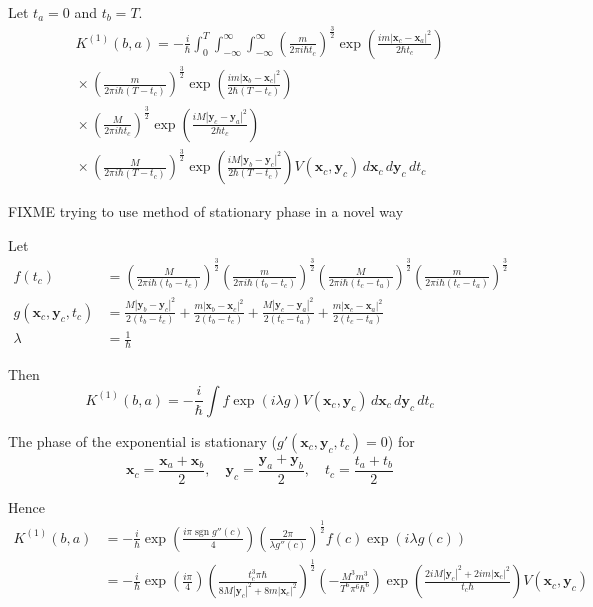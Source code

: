Let $t_a=0$ and $t_b=T$.
\begin{multline*}
K^{(1)}(b,a)=-\frac{i}{\hbar}\int_0^T\int_{-\infty}^\infty\int_{-\infty}^\infty
\left(\frac{m}{2\pi i\hbar t_c}\right)^\frac{3}{2}
\exp\left(\frac{im|\mathbf x_c-\mathbf x_a|^2}{2\hbar t_c}\right)
\\
{}\times
\left(\frac{m}{2\pi i\hbar(T-t_c)}\right)^\frac{3}{2}
\exp\left(\frac{im|\mathbf x_b-\mathbf x_c|^2}{2\hbar(T-t_c)}\right)
\\
{}\times
\left(\frac{M}{2\pi i\hbar t_c}\right)^\frac{3}{2}
\exp\left(\frac{iM|\mathbf y_c-\mathbf y_a|^2}{2\hbar t_c}\right)
\\
{}\times
\left(\frac{M}{2\pi i\hbar(T-t_c)}\right)^\frac{3}{2}
\exp\left(\frac{iM|\mathbf y_b-\mathbf y_c|^2}{2\hbar(T-t_c)}\right)
V(\mathbf x_c,\mathbf y_c)
\,d\mathbf x_c\,d\mathbf y_c\,dt_c
\end{multline*}



FIXME trying to use method of stationary phase in a novel way

\bigskip
Let
\begin{align*}
f(t_c)&=\left(\frac{M}{2\pi i\hbar(t_b-t_c)}\right)^\frac{3}{2}
\left(\frac{m}{2\pi i\hbar(t_b-t_c)}\right)^\frac{3}{2}
\left(\frac{M}{2\pi i\hbar(t_c-t_a)}\right)^\frac{3}{2}
\left(\frac{m}{2\pi i\hbar(t_c-t_a)}\right)^\frac{3}{2}
\\
g(\mathbf x_c,\mathbf y_c,t_c)
&=\frac{M|\mathbf y_b-\mathbf y_c|^2}{2(t_b-t_c)}
+\frac{m|\mathbf x_b-\mathbf x_c|^2}{2(t_b-t_c)}
+\frac{M|\mathbf y_c-\mathbf y_a|^2}{2(t_c-t_a)}
+\frac{m|\mathbf x_c-\mathbf x_a|^2}{2(t_c-t_a)}
\\
\lambda&=\frac{1}{\hbar}
\end{align*}

Then
\begin{equation*}
K^{(1)}(b,a)=-\frac{i}{\hbar}\int f\exp(i\lambda g)
V(\mathbf x_c,\mathbf y_c)
\,d\mathbf x_c\,d\mathbf y_c\,dt_c
\end{equation*}

The phase of the exponential is stationary ($g'(\mathbf x_c,\mathbf y_c,t_c)=0$) for
\begin{equation*}
\mathbf x_c=\frac{\mathbf x_a+\mathbf x_b}{2},\quad
\mathbf y_c=\frac{\mathbf y_a+\mathbf y_b}{2},\quad
t_c=\frac{t_a+t_b}{2}
\end{equation*}

Hence
\begin{align*}
K^{(1)}(b,a)&=-\frac{i}{\hbar}\exp\left(\frac{i\pi\operatorname{sgn}g''(c)}{4}\right)
\left(\frac{2\pi}{\lambda g''(c)}\right)^\frac{1}{2}
f(c)\exp(i\lambda g(c))
\\
&=-\frac{i}{\hbar}\exp\left(\frac{i\pi}{4}\right)
\left(\frac{t_c^3\pi\hbar}{8M|\mathbf y_c|^2+8m|\mathbf x_c|^2}\right)^\frac{1}{2}
\left(-\frac{M^3m^3}{T^6\pi^6\hbar^6}\right)
\exp\left(\frac{2iM|\mathbf y_c|^2+2im|\mathbf x_c|^2}{t_c\hbar}\right)
V(\mathbf x_c,\mathbf y_c)
\end{align*}


